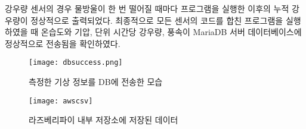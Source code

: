 강우량 센서의 경우 물방울이 한 번 떨어질 때마다 프로그램을 실행한 이후의 누적 강우량이 정상적으로 출력되었다. 최종적으로 모든 센서의 코드를 합친 프로그램을 실행하였을 때 온습도와 기압, 단위 시간당 강우량, 풍속이 MariaDB 서버 데이터베이스에 정상적으로 전송됨을 확인하였다.

\begin{figure}[htbp]
	\centering
	\texttt{[image: dbsuccess.png]}
	\caption{측정한 기상 정보를 DB에 전송한 모습}
	\label{DBSENT}
\end{figure}

\begin{figure}[htbp]
	\centering
	\texttt{[image: awscsv]}
	\caption{라즈베리파이 내부 저장소에 저장된 데이터}
	\label{AWSCSV}
\end{figure}
